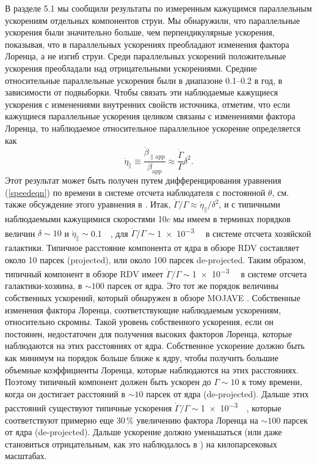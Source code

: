 В разделе 5.1 мы сообщили результаты по измеренным кажущимся параллельным ускорениям отдельных
компонентов струи. Мы обнаружили, что параллельные ускорения были значительно больше, чем
перпендикулярные ускорения, показывая, что в параллельных ускорениях преобладают изменения фактора
Лоренца, а не изгиб струи. Среди параллельных ускорений положительные ускорения преобладали над
отрицательными ускорениями. Средние относительные параллельные ускорения были в диапазоне 0.1--0.2
в год, в зависимости от подвыборки. Чтобы связать эти наблюдаемые кажущиеся ускорения с изменениями
внутренних свойств источника, отметим, что если кажущиеся параллельные ускорения целиком связаны с
изменениями фактора Лоренца, то наблюдаемое относительное параллельное ускорение определяется как
\begin{equation}
\dot{\eta}_{\parallel}\equiv\frac{\dot{\beta}_\mathrm{\parallel app}}{\beta_\mathrm{app}}\approx
\frac{\dot{\Gamma}}{\Gamma}\delta^{2}.
\end{equation}
Этот результат может быть получен путем дифференцирования уравнения (\ref{speedeqn}) по времени в
системе отсчета наблюдателя с постоянной $\theta$, см. также обсуждение этого уравнения в
\cite{Homan_2009}. Итак, $\dot{\Gamma}/\Gamma\approx\dot{\eta}_{\parallel}/\delta^{2}$, и с
типичными наблюдаемыми кажущимися скоростями 10$c$ мы имеем в терминах порядков величин $\delta\sim
10$ и $\dot{\eta}_{\parallel}\sim $\SI{0.1}{\per\year}, для
$\dot{\Gamma}/\Gamma\sim$\SI{1e-3}{\per\year} в системе отсчета хозяйской галактики.
Типичное расстояние компонента от ядра в обзоре RDV составляет около 10 парсек (projected),
или около 100 парсек de-projected. Таким образом, типичный компонент в обзоре RDV имеет
$\dot{\Gamma}/\Gamma\sim$\SI{1e-3}{\per\year} в системе отсчета галактики-хозяина, в $\sim100$
парсек от ядра. Это тот же порядок величины собственных ускорений, который обнаружен в обзоре
MOJAVE \cite{Homan_2009}. Собственные изменения фактора Лоренца, соответствующие наблюдаемым
ускорениям, относительно скромны. Такой уровень собственного ускорения, если он постоянен,
недостаточен для получения высоких факторов Лоренца, которые наблюдаются на этих расстояниях от
ядра. Собственное ускорение должно быть как минимум на порядок больше ближе к ядру, чтобы получить
большие объемные коэффициенты Лоренца, которые наблюдаются на этих расстояниях. Поэтому типичный
компонент должен быть ускорен до $\Gamma\sim10$ к тому времени, когда он достигает расстояний в
$\sim10 $ парсек от ядра (de-projected). Дальше этих расстояний существуют типичные
ускорения $\dot{\Gamma}/\Gamma\sim$\SI{1e-3}{\per\year}, которые соответствуют
примерно еще 30\,\% увеличению фактора Лоренца на $\sim 100$ парсек от ядра
(de-projected). Дальше ускорение должно уменьшаться (или даже становиться отрицательным,
как это наблюдалось в \cite{Homan_2009}) на килопарсековых масштабах.
